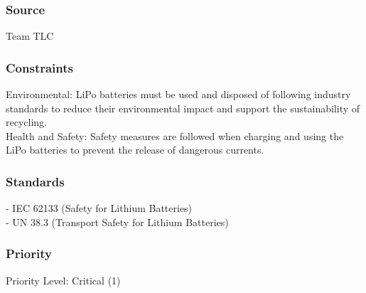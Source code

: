 \subsubsection{Source}
Team TLC

\subsubsection{Constraints}
Environmental: LiPo batteries must be used and disposed of following industry standards to reduce their environmental impact and support the sustainability of recycling.\\
Health and Safety: Safety measures are followed when charging and using the LiPo batteries to prevent the release of dangerous currents.

\subsubsection{Standards}
- IEC 62133 (Safety for Lithium Batteries)\\
- UN 38.3 (Transport Safety for Lithium Batteries)

\subsubsection{Priority}
Priority Level: Critical (1)
